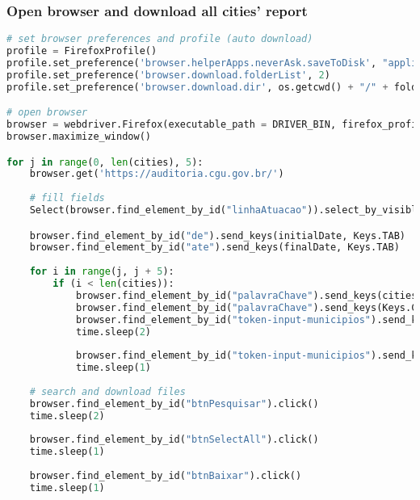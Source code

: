 \hypertarget{open-browser-and-download-all-cities-report}{%
\subsubsection{Open browser and download all cities'
report}\label{open-browser-and-download-all-cities-report}}

\begin{lstlisting}[language=Python]
# set browser preferences and profile (auto download)
profile = FirefoxProfile()
profile.set_preference('browser.helperApps.neverAsk.saveToDisk', "application/pdf,application/zip")
profile.set_preference('browser.download.folderList', 2)
profile.set_preference('browser.download.dir', os.getcwd() + "/" + folder)

# open browser
browser = webdriver.Firefox(executable_path = DRIVER_BIN, firefox_profile = profile)
browser.maximize_window()

for j in range(0, len(cities), 5):
    browser.get('https://auditoria.cgu.gov.br/')
    
    # fill fields
    Select(browser.find_element_by_id("linhaAtuacao")).select_by_visible_text('Fiscalização em Entes Federativos - Municípios')

    browser.find_element_by_id("de").send_keys(initialDate, Keys.TAB)
    browser.find_element_by_id("ate").send_keys(finalDate, Keys.TAB)
    
    for i in range(j, j + 5):
        if (i < len(cities)):
            browser.find_element_by_id("palavraChave").send_keys(cities[i], Keys.COMMAND, 'a')
            browser.find_element_by_id("palavraChave").send_keys(Keys.COMMAND, 'x')
            browser.find_element_by_id("token-input-municipios").send_keys(Keys.COMMAND, 'v')
            time.sleep(2)
            
            browser.find_element_by_id("token-input-municipios").send_keys(Keys.ENTER)
            time.sleep(1)
    
    # search and download files
    browser.find_element_by_id("btnPesquisar").click()
    time.sleep(2)
    
    browser.find_element_by_id("btnSelectAll").click()
    time.sleep(1)
    
    browser.find_element_by_id("btnBaixar").click()
    time.sleep(1)
\end{lstlisting}

